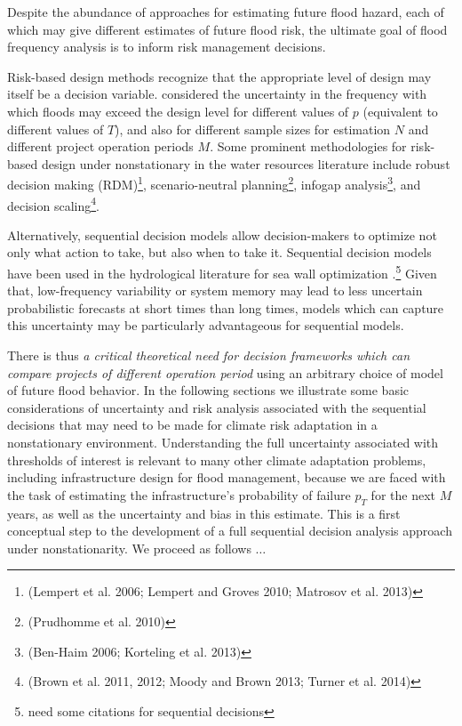 \documentclass[11pt]{article}
\begin{document}
Despite the abundance of approaches for estimating future flood hazard, each of which may give different estimates of future flood risk, the ultimate goal of flood frequency analysis is to inform risk management decisions.

Risk-based design methods \citep[RBDM; see][]{Rosner2014} recognize that the appropriate level of design may itself be a decision variable.
\citet{Lall1987} considered the uncertainty in the frequency with which floods may exceed the design level for different values of \(p\) (equivalent to different values of \(T\)), and also for different sample sizes for estimation \(N\) and different project operation periods \(M\).
Some prominent methodologies for risk-based design under nonstationary in the water resources literature include robust decision making (RDM)\footnote{(Lempert et al. 2006; Lempert and Groves 2010; Matrosov et al. 2013)}, scenario-neutral planning\footnote{(Prudhomme et al. 2010)}, infogap analysis\footnote{(Ben-Haim 2006; Korteling et al. 2013)}, and decision scaling\footnote{(Brown et al. 2011, 2012; Moody and Brown 2013; Turner et al. 2014)}.

Alternatively, sequential decision models \citep[see][]{Russell2003,Howard1960} allow decision-makers to optimize not only what action to take, but also when to take it.
Sequential decision models have been used in the hydrological literature for sea wall optimization \citep{Lickley2014}.\footnote{need some citations for sequential decisions}
Given that, low-frequency variability or system memory may lead to less uncertain probabilistic forecasts at short times than long times, models which can capture this uncertainty may be particularly advantageous for sequential models.

There is thus \emph{a critical theoretical need for decision frameworks which can compare projects of different operation period} using an arbitrary choice of model of future flood behavior.
In the following sections we illustrate some basic considerations of uncertainty and risk analysis associated with the sequential decisions that may need to be made for climate risk adaptation in a nonstationary environment.
Understanding the full uncertainty associated with thresholds of interest is relevant to many other climate adaptation problems, including infrastructure design for flood management, because we are faced with the task of estimating the infrastructure's probability of failure \(p_T\) for the next \(M\) years, as well as the uncertainty and bias in this estimate.
This is a first conceptual step to the development of a full sequential decision analysis approach under nonstationarity.
We proceed as follows \(\ldots{}\)
\end{document}

